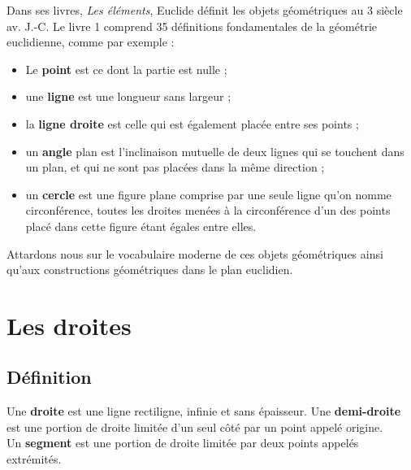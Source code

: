    
\cours

Dans ses livres, {\it Les éléments}, Euclide définit les objets géométriques au 3 siècle av. J.-C. Le livre 1 comprend 35 définitions fondamentales de la géométrie euclidienne, comme par exemple :

{\renewcommand{\StringDOCUMENTATION}{Les définitions d'Euclide}
\begin{documentation}
   {\it
   \begin{itemize}
      \item Le {\bf point} est ce dont la partie est nulle ;
      \item une {\bf ligne} est une longueur sans largeur ;
      \item la {\bf ligne droite} est celle qui est également placée entre ses points ;
      \item un {\bf angle} plan est l'inclinaison mutuelle de deux lignes qui se touchent dans un plan, et qui ne sont pas placées dans la même direction ;
      \item un {\bf cercle} est une figure plane comprise par une seule ligne qu'on nomme circonférence, toutes les droites menées à la circonférence d'un des points placé dans cette figure étant égales entre elles. \\ [-8mm]
   \end{itemize}}
\end{documentation}}

\medskip

Attardons nous sur le vocabulaire \og moderne \fg{} de ces objets géométriques ainsi qu'aux constructions géométriques dans le plan euclidien.

\section{Les droites} %

\subsection{Définition} %

\begin{definition}
   Une \textbf{droite} est une ligne rectiligne, infinie et sans épaisseur. Une \textbf{demi-droite} est une portion de droite limitée d'un seul côté par un point appelé origine. \\
   Un \textbf{segment} est une portion de droite limitée par deux points appelés extrémités.
\end{definition}

